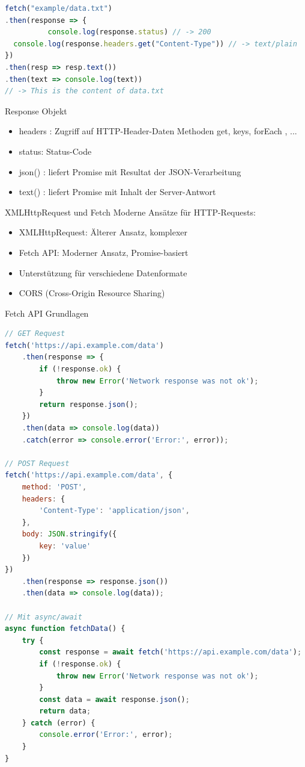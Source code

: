 \begin{lstlisting}[language=JavaScript, style=basesmol]
fetch("example/data.txt")
.then(response => {
          console.log(response.status) // -> 200
  console.log(response.headers.get("Content-Type")) // -> text/plain
})
.then(resp => resp.text())
.then(text => console.log(text))
// -> This is the content of data.txt
\end{lstlisting}

\begin{definition}{Response Objekt}

\begin{itemize}
\item headers : Zugriff auf HTTP-Header-Daten Methoden get, keys, forEach , ...
\item status: Status-Code
\item json() : liefert Promise mit Resultat der JSON-Verarbeitung
\item text() : liefert Promise mit Inhalt der Server-Antwort
\end{itemize}
\end{definition}


\begin{concept}{XMLHttpRequest und Fetch}
    Moderne Ansätze für HTTP-Requests:
    \begin{itemize}
        \item XMLHttpRequest: Älterer Ansatz, komplexer
        \item Fetch API: Moderner Ansatz, Promise-basiert
        \item Unterstützung für verschiedene Datenformate
        \item CORS (Cross-Origin Resource Sharing)
    \end{itemize}
\end{concept}

\begin{KR}{Fetch API Grundlagen}
\begin{lstlisting}[language=JavaScript, style=basesmol]
// GET Request
fetch('https://api.example.com/data')
    .then(response => {
        if (!response.ok) {
            throw new Error('Network response was not ok');
        }
        return response.json();
    })
    .then(data => console.log(data))
    .catch(error => console.error('Error:', error));

// POST Request
fetch('https://api.example.com/data', {
    method: 'POST',
    headers: {
        'Content-Type': 'application/json',
    },
    body: JSON.stringify({
        key: 'value'
    })
})
    .then(response => response.json())
    .then(data => console.log(data));

// Mit async/await
async function fetchData() {
    try {
        const response = await fetch('https://api.example.com/data');
        if (!response.ok) {
            throw new Error('Network response was not ok');
        }
        const data = await response.json();
        return data;
    } catch (error) {
        console.error('Error:', error);
    }
}
\end{lstlisting}
\end{KR}



